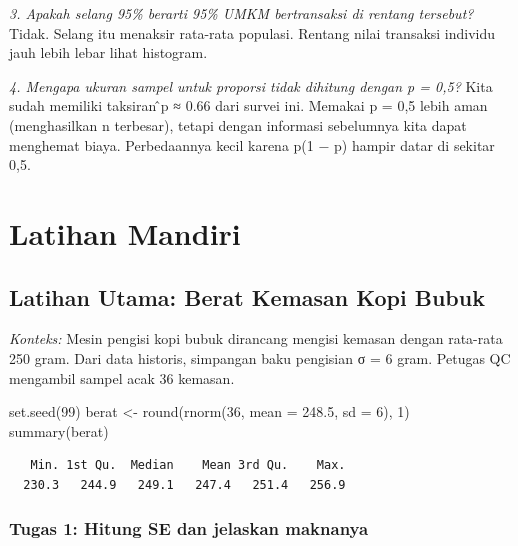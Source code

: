 \documentclass[
  indonesian,
  letterpaper,
]{book}
\newenvironment{Shaded}{\begin{snugshade}}{\end{snugshade}}
\newcommand{\AttributeTok}[1]{\textcolor[rgb]{0.40,0.45,0.13}{#1}}
\newcommand{\DecValTok}[1]{\textcolor[rgb]{0.68,0.00,0.00}{#1}}
\newcommand{\FloatTok}[1]{\textcolor[rgb]{0.68,0.00,0.00}{#1}}
\newcommand{\FunctionTok}[1]{\textcolor[rgb]{0.28,0.35,0.67}{#1}}
\newcommand{\NormalTok}[1]{\textcolor[rgb]{0.00,0.23,0.31}{#1}}
\newcommand{\OtherTok}[1]{\textcolor[rgb]{0.00,0.23,0.31}{#1}}
\begin{document}
\emph{3. Apakah selang 95\% berarti 95\% UMKM bertransaksi di rentang
tersebut?} Tidak. Selang itu menaksir rata-rata populasi. Rentang nilai
transaksi individu jauh lebih lebar lihat histogram.

\emph{4. Mengapa ukuran sampel untuk proporsi tidak dihitung dengan p =
0,5?} Kita sudah memiliki taksiran ̂p ≈ 0.66 dari survei ini. Memakai p
= 0,5 lebih aman (menghasilkan n terbesar), tetapi dengan informasi
sebelumnya kita dapat menghemat biaya. Perbedaannya kecil karena p(1 −
p) hampir datar di sekitar 0,5.


\chapter{Latihan Mandiri}\label{latihan-mandiri}

\section{Latihan Utama: Berat Kemasan Kopi
Bubuk}\label{latihan-utama-berat-kemasan-kopi-bubuk}

\emph{Konteks:} Mesin pengisi kopi bubuk dirancang mengisi kemasan
dengan rata-rata 250 gram. Dari data historis, simpangan baku pengisian
σ = 6 gram. Petugas QC mengambil sampel acak 36 kemasan.

\begin{Shaded}
\begin{Highlighting}[]
\FunctionTok{set.seed}\NormalTok{(}\DecValTok{99}\NormalTok{)}
\NormalTok{berat }\OtherTok{\textless{}{-}} \FunctionTok{round}\NormalTok{(}\FunctionTok{rnorm}\NormalTok{(}\DecValTok{36}\NormalTok{, }\AttributeTok{mean =} \FloatTok{248.5}\NormalTok{, }\AttributeTok{sd =} \DecValTok{6}\NormalTok{), }\DecValTok{1}\NormalTok{)}
\FunctionTok{summary}\NormalTok{(berat)}
\end{Highlighting}
\end{Shaded}

\begin{verbatim}
   Min. 1st Qu.  Median    Mean 3rd Qu.    Max. 
  230.3   244.9   249.1   247.4   251.4   256.9 
\end{verbatim}

\subsection{Tugas 1: Hitung SE dan jelaskan
maknanya}\label{tugas-1-hitung-se-dan-jelaskan-maknanya}
\end{document}
